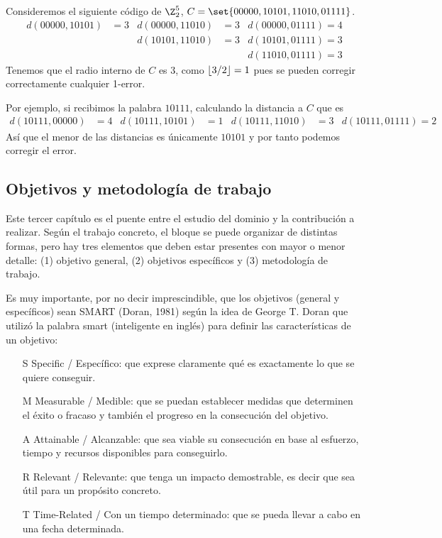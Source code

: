 \begin{example}
	Consideremos el siguiente código de $\Z_2^5$, $C=\set{00000, 10101, 11010, 01111}$.
	\begin{align*}
		d(00000, 10101) &= 3 & d(00000, 11010) &= 3 & d(00000, 01111) = 4 \\
		 & & d(10101, 11010) &= 3 & d(10101, 01111) = 3 \\
		& & & & d(11010, 01111) = 3
	\end{align*}
	Tenemos que el radio interno de $C$ es $3$, como $\lfloor 3/2 \rfloor=1$ pues se pueden corregir correctamente cualquier 1-error.

	Por ejemplo, si recibimos la palabra $10111$, calculando la distancia a $C$ que es
	\begin{align*}
		d(10111, 00000) &= 4 & d(10111, 10101) &= 1 & d(10111, 11010) &= 3 & d(10111, 01111) = 2
	\end{align*}
	Así que el menor de las distancias es únicamente $10101$ y por tanto podemos corregir el error.
\end{example}

\subsection{Objetivos y metodología de trabajo}

Este tercer capítulo es el puente entre el estudio del dominio y la contribución a realizar.
Según el trabajo concreto, el bloque se puede organizar de distintas formas, pero hay tres elementos que deben estar presentes con mayor o menor detalle: (1) objetivo general, (2) objetivos específicos y (3) metodología de trabajo.

Es muy importante, por no decir imprescindible, que los objetivos (general y específicos) sean SMART (Doran, 1981) según la idea de George T. Doran que utilizó la palabra smart (inteligente en inglés) para definir las características de un objetivo:
\begin{itemize}
	\item[S] Specific / Específico: que exprese claramente qué es exactamente lo que se quiere conseguir.
	\item[M] Measurable / Medible: que se puedan establecer medidas que determinen el éxito o fracaso y también el progreso en la consecución del objetivo.
	\item[A] Attainable / Alcanzable: que sea viable su consecución en base al esfuerzo, tiempo y recursos disponibles para conseguirlo.
	\item[R] Relevant / Relevante: que tenga un impacto demostrable, es decir que sea útil para un propósito concreto.
	\item[T] Time-Related / Con un tiempo determinado: que se pueda llevar a cabo en una fecha determinada.
\end{itemize}

